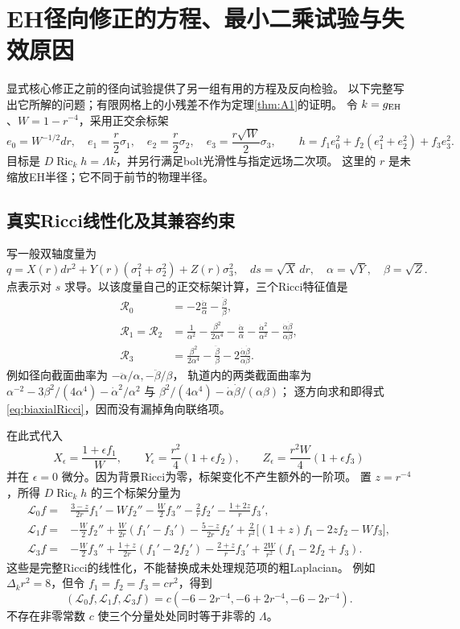 \documentclass[UTF8,a4paper,11pt,fontset=fandol]{ctexart}
\numberwithin{equation}{section}
\theoremstyle{definition}
\newcommand{\Ric}{\operatorname{Ric}}
\begin{document}
\section{EH径向修正的方程、最小二乘试验与失效原因}\label{sec:eh-ls}
显式核心修正之前的径向试验提供了另一组有用的方程及反向检验。
以下完整写出它所解的问题；有限网格上的小残差不作为定理\ref{thm:A1}的证明。
令 $k=g_{\rm EH}$、$W=1-r^{-4}$，采用正交余标架
\[
e_0=W^{-1/2}dr,\quad e_1=\frac r2\sigma_1,\quad
e_2=\frac r2\sigma_2,\quad e_3=\frac{r\sqrt W}{2}\sigma_3,
\qquad
h=f_1e_0^2+f_2(e_1^2+e_2^2)+f_3e_3^2.
\]
目标是 $D\Ric_kh=\Lambda k$，并另行满足bolt光滑性与指定远场二次项。
这里的 $r$ 是未缩放EH半径；它不同于前节的物理半径。

\subsection{真实Ricci线性化及其兼容约束}
写一般双轴度量为
\[
q=X(r)dr^2+Y(r)(\sigma_1^2+\sigma_2^2)+Z(r)\sigma_3^2,
\quad ds=\sqrt X\,dr,\quad \alpha=\sqrt Y,\quad\beta=\sqrt Z.
\]
点表示对 $s$ 求导。以该度量自己的正交标架计算，三个Ricci特征值是
\begin{align}
\mathscr R_0&=-2\frac{\ddot\alpha}{\alpha}-\frac{\ddot\beta}{\beta},\nonumber\\
\mathscr R_1=\mathscr R_2
&=\frac1{\alpha^2}-\frac{\beta^2}{2\alpha^4}
-\frac{\ddot\alpha}{\alpha}-\frac{\dot\alpha^2}{\alpha^2}
-\frac{\dot\alpha\dot\beta}{\alpha\beta},\label{eq:biaxialRicci}\\
\mathscr R_3&=\frac{\beta^2}{2\alpha^4}
-\frac{\ddot\beta}{\beta}-2\frac{\dot\alpha\dot\beta}{\alpha\beta}.
\nonumber
\end{align}
例如径向截面曲率为 $-\ddot\alpha/\alpha,-\ddot\beta/\beta$，
轨道内的两类截面曲率为
$\alpha^{-2}-3\beta^2/(4\alpha^4)-\dot\alpha^2/\alpha^2$ 与
$\beta^2/(4\alpha^4)-\dot\alpha\dot\beta/(\alpha\beta)$；
逐方向求和即得式\eqref{eq:biaxialRicci}，因而没有漏掉角向联络项。

在此式代入
\[
X_\epsilon=\frac{1+\epsilon f_1}{W},\qquad
Y_\epsilon=\frac{r^2}{4}(1+\epsilon f_2),\qquad
Z_\epsilon=\frac{r^2W}{4}(1+\epsilon f_3)
\]
并在 $\epsilon=0$ 微分。因为背景Ricci为零，标架变化不产生额外的一阶项。
置 $z=r^{-4}$，所得 $D\Ric_kh$ 的三个标架分量为
\begin{align}
\mathscr L_0f={}&\frac{3-z}{2r}f_1'-Wf_2''-\frac W2f_3''
-\frac2r f_2'-\frac{1+2z}{r}f_3',\nonumber\\
\mathscr L_1f={}&-\frac W2f_2''+\frac W{2r}(f_1'-f_3')
-\frac{5-z}{2r}f_2'
+\frac2{r^2}\bigl[(1+z)f_1-2zf_2-Wf_3\bigr],\label{eq:eh-radial-linear}\\
\mathscr L_3f={}&-\frac W2f_3''+\frac{1+z}{2r}(f_1'-2f_2')
-\frac{2+z}{r}f_3'+\frac{2W}{r^2}(f_1-2f_2+f_3).
\nonumber
\end{align}
这些是完整Ricci的线性化，不能替换成未处理规范项的粗Laplacian。
例如 $\Delta_kr^2=8$，但令 $f_1=f_2=f_3=cr^2$，得到
\[
(\mathscr L_0f,\mathscr L_1f,\mathscr L_3f)
=c(-6-2r^{-4},-6+2r^{-4},-6-2r^{-4}).
\]
不存在非零常数 $c$ 使三个分量处处同时等于非零的 $\Lambda$。
\end{document}
